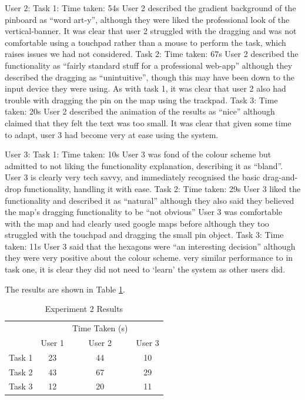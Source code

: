 \documentclass[10pt,a4paper]{article}
\begin{document}
User 2:
Task 1:
Time taken: 54s
User 2 described the gradient background of the pinboard as “word art-y”, although they were liked the professional look of the vertical-banner.
It was clear that user 2 struggled with the dragging and was not comfortable using a touchpad rather than a mouse to perform the task, which raises issues we had not considered.
Task 2:
Time taken: 67s
User 2 described the functionality as “fairly standard stuff for a professional web-app” although they described the dragging as “unintuitive”, though this may have been down to the input device they were using. 
As with task 1, it was clear that user 2 also had trouble with dragging the pin on the map using the trackpad.
Task 3:
Time taken: 20s
User 2 described the animation of the results as “nice” although claimed that they felt the text was too small.
It was clear that given some time to adapt, user 3 had become very at ease using the system.

User 3:
Task 1:
Time taken: 10s
User 3 was fond of the colour scheme but admitted to not liking the functionality explanation, describing it as “bland”.
User 3 is clearly very tech savvy, and immediately recognised the basic drag-and-drop functionality, handling it with ease.
Task 2:
Time taken: 29s
User 3 liked the functionality and described it as “natural” although they also said they believed the map’s dragging functionality to be “not obvious”
User 3 was comfortable with the map and had clearly used google maps before although they too struggled with the touchpad and dragging the small pin object.
Task 3:
Time taken: 11s
User 3 said that the hexagons were “an interesting decision” although they were very positive about the colour scheme.
very similar performance to in task one, it is clear they did not need to ‘learn’ the system as other users did.


The results are shown in Table \ref{table:experiment-2}.

\begin{table}[H]
\centering
\begin{tabular}{c|ccc|}
\cline{2-4}
                             &                             & Time Taken (s)              &        \\ \cline{2-4} 
                             & \multicolumn{1}{c|}{User 1} & \multicolumn{1}{c|}{User 2} & User 3 \\ \hline
\multicolumn{1}{|c|}{Task 1} & \multicolumn{1}{c|}{23}       & \multicolumn{1}{c|}{44}       &  10      \\ \hline
\multicolumn{1}{|c|}{Task 2} & \multicolumn{1}{c|}{43}       & \multicolumn{1}{c|}{67}       &    29    \\ \hline
\multicolumn{1}{|c|}{Task 3} & \multicolumn{1}{c|}{12}       & \multicolumn{1}{c|}{20}       &    11    \\ \hline
\end{tabular}
\caption{Experiment 2 Results \label{table:experiment-2}}
\end{table}
\end{document}
